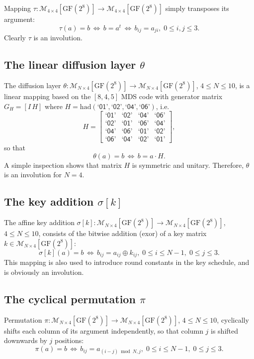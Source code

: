\documentclass{llncs}
\newcommand{\GF}{\mathrm{GF}}
\newcommand{\had}{\mathrm{had}}
\newcommand{\matrices}[2]{\mathcal{M}_{#1 \times #2}[\GF(2^8)]}
\newcommand{\gf}[1]{\textsf{`#1'}}
\begin{document}
Mapping $\tau: \matrices{4}{4} \rightarrow \matrices{4}{4}$
simply transposes its argument:
\[
\tau(a) = b \,\Leftrightarrow\, b = a^t \,\Leftrightarrow\, b_{ij}
= a_{ji}, \; 0 \leqslant i, j \leqslant 3.
\]
Clearly $\tau$ is an involution.

\subsection{The linear diffusion layer $\theta$}

The diffusion layer $\theta: \matrices{N}{4} \rightarrow
\matrices{N}{4}$, $4 \leqslant N \leqslant 10$, is a linear
mapping based on the $[8, 4, 5]$ MDS code with generator matrix
$G_H = [I \, H]$ where $H = \had(\gf{01}, \gf{02}, \gf{04},
\gf{06})$, i.e.
\[
H = \left[\begin{array}{cccc} %
\gf{01} & \gf{02} & \gf{04} & \gf{06}\\
\gf{02} & \gf{01} & \gf{06} & \gf{04}\\
\gf{04} & \gf{06} & \gf{01} & \gf{02}\\
\gf{06} & \gf{04} & \gf{02} & \gf{01}
\end{array}\right],
\]
so that
\[
\theta(a) = b \,\Leftrightarrow\, b = a \cdot H.
\]
A simple inspection shows that matrix $H$ is symmetric and
unitary. Therefore, $\theta$ is an involution for $N = 4$.

\subsection{The key addition $\sigma[k]$}

The affine key addition $\sigma[k]: \matrices{N}{4} \rightarrow
\matrices{N}{4}$, $4 \leqslant N \leqslant 10$, consists of the
bitwise addition (exor) of a key matrix $k \in \matrices{N}{4}$:
\[
\sigma[k](a) = b \,\Leftrightarrow\, b_{ij} = a_{ij} \oplus
k_{ij}, \; 0 \leqslant i \leqslant N-1, \; 0 \leqslant j
\leqslant 3.
\]
This mapping is also used to introduce round constants in the key
schedule, and is obviously an involution.

\subsection{The cyclical permutation $\pi$}

Permutation $\pi: \matrices{N}{4} \rightarrow \matrices{N}{4}$,
$4 \leqslant N \leqslant 10$, cyclically shifts each column of
its argument independently, so that column $j$ is shifted
downwards by $j$ positions:
\[
\pi(a) = b \,\Leftrightarrow\, b_{ij} = a_{(i-j) \bmod N, j}, \;
0 \leqslant i \leqslant N-1, \; 0 \leqslant j \leqslant 3.
\]
\end{document}
